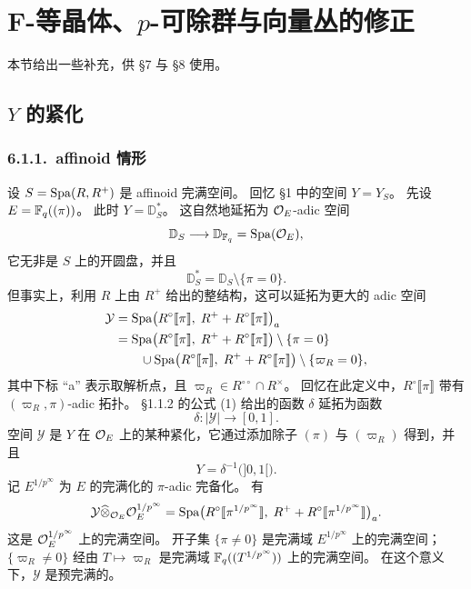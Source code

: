
\section{F-等晶体、\texorpdfstring{$p$}{p}-可除群与向量丛的修正}
\label{sec:fisoc}

本节给出一些补充，供 §7 与 §8 使用。

\subsection{\texorpdfstring{$Y$}{Y} 的紧化}
\label{sec:fisoc-compactification}

\subsubsection*{6.1.1.\ affinoid 情形}

设 $S=\mathrm{Spa}(R,R^+)$ 是 affinoid 完满空间。
回忆 §1 中的空间 $Y=Y_S$。
先设 $E=\mathbb{F}_q((\pi))$。
此时 $Y=\mathbb{D}_S^*$。
这自然地延拓为 $\mathcal{O}_E$-adic 空间
\[
\mathbb{D}_S\longrightarrow\mathbb{D}_{\mathbb{F}_q}=\mathrm{Spa}(\mathcal{O}_E),
\]
它无非是 $S$ 上的开圆盘，并且
\[
\mathbb{D}_S^*=\mathbb{D}_S\setminus\{\pi=0\}.
\]
但事实上，利用 $R$ 上由 $R^+$ 给出的整结构，这可以延拓为更大的 adic 空间
\[
\begin{aligned}
\mathcal{Y}&=\mathrm{Spa}\bigl(R^\circ\llbracket\pi\rrbracket,\;R^+ + R^\circ\llbracket\pi\rrbracket\bigr)_a\\
&=\mathrm{Spa}\bigl(R^\circ\llbracket\pi\rrbracket,\;R^+ + R^\circ\llbracket\pi\rrbracket\bigr)\setminus\{\pi=0\}\\
&\qquad\cup\mathrm{Spa}\bigl(R^\circ\llbracket\pi\rrbracket,\;R^+ + R^\circ\llbracket\pi\rrbracket\bigr)\setminus\{\varpi_R=0\},
\end{aligned}
\]
其中下标 “a” 表示取解析点，且 $\varpi_R\in R^{\circ\circ}\cap R^\times$。
回忆在此定义中，$R^\circ\llbracket\pi\rrbracket$ 带有 $(\varpi_R,\pi)$-adic 拓扑。
§1.1.2 的公式 (1) 给出的函数 $\delta$ 延拓为函数
\[
\delta:|\mathcal{Y}|\longrightarrow[0,1].
\]
空间 $\mathcal{Y}$ 是 $Y$ 在 $\mathcal{O}_E$ 上的某种紧化，它通过添加除子 $(\pi)$ 与 $(\varpi_R)$ 得到，并且
\[
Y=\delta^{-1}\bigl({]0,1[}\bigr).
\]
记 $E^{1/p^\infty}$ 为 $E$ 的完满化的 $\pi$-adic 完备化。
有
\[
\mathcal{Y}\widehat{\otimes}_{\mathcal{O}_E}\mathcal{O}_E^{1/p^\infty}
=\mathrm{Spa}\bigl(R^\circ\llbracket\pi^{1/p^\infty}\rrbracket,\;R^+ + R^\circ\llbracket\pi^{1/p^\infty}\rrbracket\bigr)_a.
\]
这是 $\mathcal{O}_E^{1/p^\infty}$ 上的完满空间。
开子集 $\{\pi\neq0\}$ 是完满域 $E^{1/p^\infty}$ 上的完满空间；$\{\varpi_R\neq0\}$ 经由 $T\mapsto\varpi_R$ 是完满域 $\mathbb{F}_q((T^{1/p^\infty}))$ 上的完满空间。
在这个意义下，$\mathcal{Y}$ 是预完满的。

